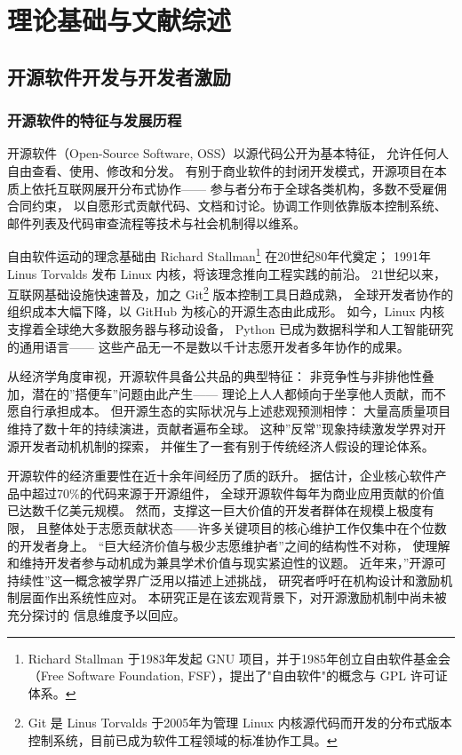 \chapter{理论基础与文献综述}

\section{开源软件开发与开发者激励}

\subsection{开源软件的特征与发展历程}

开源软件（Open-Source Software, OSS）以源代码公开为基本特征，
允许任何人自由查看、使用、修改和分发\cite{lakhani2003open}。
有别于商业软件的封闭开发模式，开源项目在本质上依托互联网展开分布式协作——
参与者分布于全球各类机构，多数不受雇佣合同约束，
以自愿形式贡献代码、文档和讨论。协调工作则依靠版本控制系统、
邮件列表及代码审查流程等技术与社会机制得以维系。

自由软件运动的理念基础由 Richard Stallman\footnote{Richard Stallman 于1983年发起 GNU 项目，并于1985年创立自由软件基金会（Free Software Foundation, FSF），提出了"自由软件"的概念与 GPL 许可证体系。} 在20世纪80年代奠定；
1991年 Linus Torvalds 发布 Linux 内核，将该理念推向工程实践的前沿。
21世纪以来，互联网基础设施快速普及，加之 Git\footnote{Git 是 Linus Torvalds 于2005年为管理 Linux 内核源代码而开发的分布式版本控制系统，目前已成为软件工程领域的标准协作工具。} 版本控制工具日趋成熟，
全球开发者协作的组织成本大幅下降，以 GitHub 为核心的开源生态由此成形。
如今，Linux 内核支撑着全球绝大多数服务器与移动设备，
Python 已成为数据科学和人工智能研究的通用语言——
这些产品无一不是数以千计志愿开发者多年协作的成果。

从经济学角度审视，开源软件具备公共品的典型特征：
非竞争性与非排他性叠加，潜在的”搭便车”问题由此产生——
理论上人人都倾向于坐享他人贡献，而不愿自行承担成本\cite{lerner2002simple}。
但开源生态的实际状况与上述悲观预测相悖：
大量高质量项目维持了数十年的持续演进，贡献者遍布全球。
这种”反常”现象持续激发学界对开源开发者动机机制的探索\cite{gerosa2021shifting}，
并催生了一套有别于传统经济人假设的理论体系。

开源软件的经济重要性在近十余年间经历了质的跃升。
据估计，企业核心软件产品中超过70\%的代码来源于开源组件，
全球开源软件每年为商业应用贡献的价值已达数千亿美元规模。
然而，支撑这一巨大价值的开发者群体在规模上极度有限，
且整体处于志愿贡献状态——许多关键项目的核心维护工作仅集中在个位数的开发者身上\cite{lu2021core,jamieson2024predicting}。
“巨大经济价值与极少志愿维护者”之间的结构性不对称，
使理解和维持开发者参与动机成为兼具学术价值与现实紧迫性的议题。
近年来，”开源可持续性”这一概念被学界广泛用以描述上述挑战，
研究者呼吁在机构设计和激励机制层面作出系统性应对\cite{alami2024sustainability,wang2025opensource,qi2021opensource}。
本研究正是在该宏观背景下，对开源激励机制中尚未被充分探讨的
信息维度予以回应。


